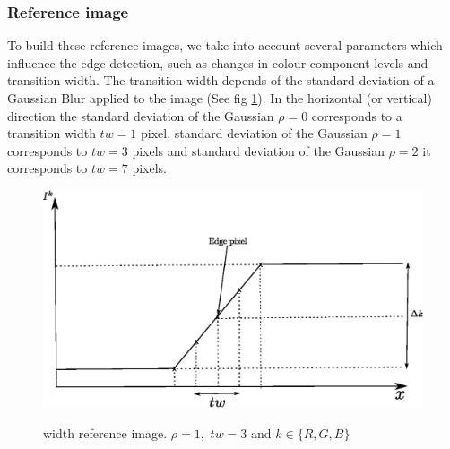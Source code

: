 \documentclass[twoside]{article}
\begin{document}
\subsubsection{Reference image}
\label{sec:Reference image}
To build these reference images, we take into account several parameters which influence the edge detection, such as changes in colour component levels and transition width. 
The transition width depends of the standard deviation of a Gaussian Blur applied to the image (See fig \ref{fig: image_reference_transition_width}). In the horizontal (or vertical) direction the standard deviation of the Gaussian $\rho=0$ corresponds to a transition width  $tw=1$ pixel, standard deviation of the Gaussian $\rho=1$ corresponds to $tw=3$ pixels and standard deviation of the Gaussian $\rho=2$ it corresponds to $tw=7$ pixels. 
\begin{figure}
	\centering		
		\includegraphics[width=1\linewidth]{fig/width_reference_image} 
		\label{sfig: image_reference_sigma_0}
	
	\caption[width reference image.]{width reference image. $\rho=1$,~$tw=3$ and $k\in\{R,G,B\}$}
	\label{fig: image_reference_transition_width}
\end{figure}
\end{document}

